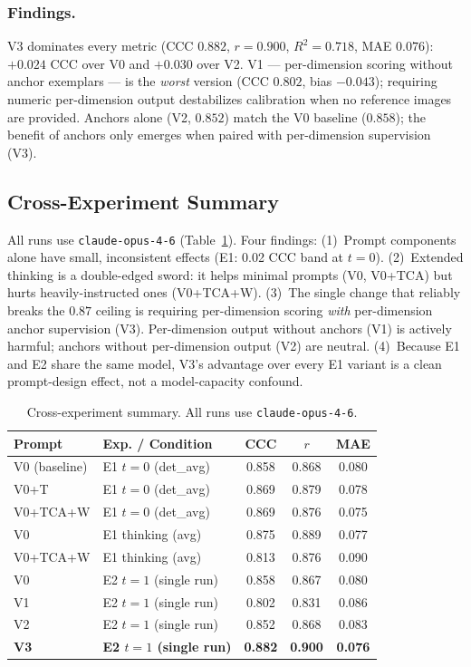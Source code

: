 \subsubsection{Findings.}
V3 dominates every metric (CCC $0.882$, $r = 0.900$, $R^2 = 0.718$,
MAE $0.076$): $+0.024$ CCC over V0 and $+0.030$ over V2.
V1 --- per-dimension scoring without anchor exemplars --- is the
\emph{worst} version (CCC $0.802$, bias $-0.043$); requiring numeric
per-dimension output destabilizes calibration when no reference images are
provided. Anchors alone (V2, $0.852$) match the V0 baseline ($0.858$); the
benefit of anchors only emerges when paired with per-dimension supervision
(V3).

\subsection{Cross-Experiment Summary}
\label{app:vc-cross}

All runs use \texttt{claude-opus-4-6} (Table~\ref{tab:cross-exp}). Four
findings:
(1)~Prompt components alone have small, inconsistent effects
(E1: 0.02 CCC band at $t=0$).
(2)~Extended thinking is a double-edged sword: it helps minimal prompts
(V0, V0+TCA) but hurts heavily-instructed ones (V0+TCA+W).
(3)~The single change that reliably breaks the $0.87$ ceiling is requiring
per-dimension scoring \emph{with} per-dimension anchor supervision (V3).
Per-dimension output without anchors (V1) is actively harmful; anchors
without per-dimension output (V2) are neutral.
(4)~Because E1 and E2 share the same model, V3's advantage over every E1
variant is a clean prompt-design effect, not a model-capacity confound.

\begin{table}[t]
  \centering
  \caption{Cross-experiment summary. All runs use \texttt{claude-opus-4-6}.}
  \label{tab:cross-exp}
  \small
  \begin{tabular*}{\linewidth}{@{\extracolsep{\fill}}llccc@{}}
    \toprule
    Prompt & Exp. / Condition & CCC & $r$ & MAE\\
    \midrule
    V0 (baseline)        & E1 $t{=}0$ (det\_avg)    & 0.858 & 0.868 & 0.080\\
    V0+T                 & E1 $t{=}0$ (det\_avg)    & 0.869 & 0.879 & 0.078\\
    V0+TCA+W             & E1 $t{=}0$ (det\_avg)    & 0.869 & 0.876 & 0.075\\
    V0                   & E1 thinking (avg)        & 0.875 & 0.889 & 0.077\\
    V0+TCA+W             & E1 thinking (avg)        & 0.813 & 0.876 & 0.090\\
    V0                   & E2 $t{=}1$ (single run)  & 0.858 & 0.867 & 0.080\\
    V1                   & E2 $t{=}1$ (single run)  & 0.802 & 0.831 & 0.086\\
    V2                   & E2 $t{=}1$ (single run)  & 0.852 & 0.868 & 0.083\\
    \textbf{V3}          & \textbf{E2 $t{=}1$ (single run)} & \textbf{0.882} & \textbf{0.900} & \textbf{0.076}\\
    \bottomrule
  \end{tabular*}
\end{table}

